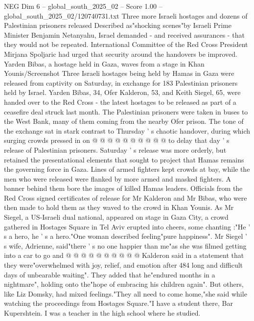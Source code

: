 \begin{textsample}{NEG Dim 6 – global\_south\_2025\_02 – Score 1.00 – global\_south\_2025\_02/120740731.txt}  \label{ex:f6_neg_040}
Three more Israeli hostages and dozens of Palestinian prisoners released Described as"shocking scenes"by Israeli Prime Minister Benjamin Netanyahu, Israel demanded - and received assurances - that they would not be repeated.
International Committee of the Red Cross President Mirjana Spoljaric had urged that security around the handovers be improved.
Yarden Bibas, a hostage held in Gaza, waves from a stage in Khan Younis/Screenshot Three Israeli hostages being held by Hamas in Gaza were released from captivity on Saturday, in exchange for 183 Palestinian prisoners held by Israel.
Yarden Bibas, 34, Ofer Kalderon, 53, and Keith Siegel, 65, were handed over to the Red Cross - the latest hostages to be released as part of a ceasefire deal struck last month.
The Palestinian prisoners were taken in buses to the West Bank, many of them coming from the nearby Ofer prison.
The tone of the exchange sat in stark contrast to Thursday ' s chaotic handover, during which surging crowds pressed in on @ @ @ @ @ @ @ @ @ @ to delay that day ' s release of Palestinian prisoners.
Saturday ' s release was more orderly, but retained the presentational elements that sought to project that Hamas remains the governing force in Gaza.
Lines of armed fighters kept crowds at bay, while the men who were released were flanked by more armed and masked fighters.
A banner behind them bore the images of killed Hamas leaders.
Officials from the Red Cross signed certificates of release for Mr Kalderon and Mr Bibas, who were then made to hold them as they waved to the crowd in Khan Younis.
As Mr Siegel, a US-Israeli dual national, appeared on stage in Gaza City, a crowd gathered in Hostages Square in Tel Aviv erupted into cheers, some chanting :"He ' s a hero, he ' s a hero."One woman described feeling"pure happiness".
Mr Siegel ' s wife, Adrienne, said"there ' s no one happier than me"as she was filmed getting into a car to go and @ @ @ @ @ @ @ @ @ @ Kalderon said in a statement that they were"overwhelmed with joy, relief, and emotion after 484 long and difficult days of unbearable waiting".
They added that he"endured months in a nightmare", holding onto the"hope of embracing his children again".
But others, like Liz Domsky, had mixed feelings."They all need to come home,"she said while watching the proceedings from Hostages Square."I have a student there, Bar Kupershtein.
I was a teacher in the high school where he studied.

\end{textsample}

